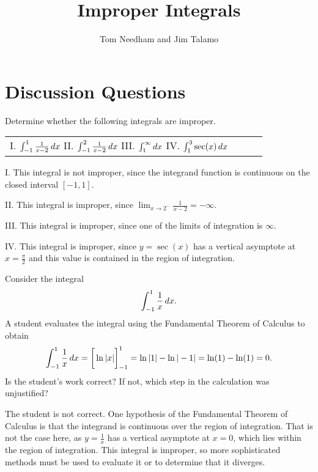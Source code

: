 \documentclass[handout]{ximera}
\author{Tom Needham and Jim Talamo}
\title[]{Improper Integrals}
\begin{document}
\begin{abstract}
\end{abstract}
\maketitle

\vspace{-0.7in}

\section{Discussion Questions}

\begin{problem}
Determine whether the following integrals are improper.
\begin{center}
\begin{tabular}{llll}
I. $\int_{-1}^1 \frac{1}{x-2} \mathop{}\!d x$ \hspace{.2in} II. $\int_{-1}^2 \frac{1}{x-2} \mathop{}\!d x$ \hspace{.2in} III. $\int_1^\infty \mathop{}\!d x$ \hspace{.2in} IV. $\int_1^3 \sec (x) \mathop{}\!d x$
\end{tabular}
\end{center}
\end{problem}

\begin{freeResponse}
I. This integral is not improper, since the integrand function is continuous on the closed interval $[-1,1]$.

II. This integral is improper, since $\lim_{x \rightarrow 2^-} \frac{1}{x-2} = -\infty$.

III. This integral is improper, since one of the limits of integration is $\infty$.

IV. This integral is improper, since $y=\sec(x)$ has a vertical asymptote at $x = \frac{\pi}{2}$ and this value is contained in the region of integration.
\end{freeResponse}

\begin{problem}
Consider the integral
$$
\int_{-1}^1 \frac{1}{x} \mathop{}\!d x.
$$
A student evaluates the integral using the Fundamental Theorem of Calculus to obtain
$$
\int_{-1}^1 \frac{1}{x} \mathop{}\!d x = \bigg[  \ln |x|  \bigg]_{-1}^1 = \ln |1| - \ln |-1| = \ln (1)  - \ln (1) = 0.
$$
Is the student's work correct? If not, which step in the calculation was unjustified?
\end{problem}

\begin{freeResponse}
The student is not correct. One hypothesis of the  Fundamental Theorem of Calculus is that the integrand is continuous over the region of integration. That is not the case here, as $y=\frac{1}{x}$ has a vertical asymptote at $x=0$, which lies within the region of integration. This integral is improper, so more sophisticated methods must be used to evaluate it or to determine that it diverges.
\end{freeResponse}
\end{document}
